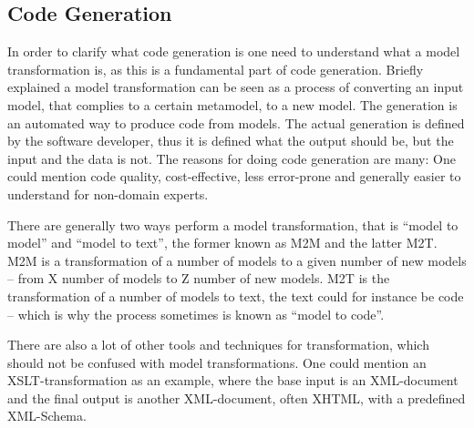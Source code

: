 \subsection{Code Generation}
\label{background-codegeneration}

In order to clarify what code generation is one need to understand what a model
transformation is, as this is a fundamental part of code generation. Briefly explained a model transformation can be seen as a process of converting an input model, that complies to a certain metamodel, to a new model. The generation is an automated way to produce code from models. The actual generation is defined by the software developer, thus it is defined what the output should be, but the input and the data is not. The reasons for doing code generation are many: One could mention code quality, cost-effective, less error-prone and generally easier to understand for non-domain experts.

There are generally two ways perform a model transformation, that is ``model to model'' and ``model to text'', the former known as M2M and the latter M2T. M2M is a transformation of a number of models to a given number of new models -- from X number of models to Z number of new models. M2T is  the transformation of a number of models to text, the text could for instance be code -- which is why the process sometimes is known as ``model to code''.

There are also a lot of other tools and techniques for transformation, which should not be confused with model transformations. One could mention an XSLT-transformation as an example, where the base input is an XML-document and the final output is
another XML-document, often XHTML, with a predefined XML-Schema.